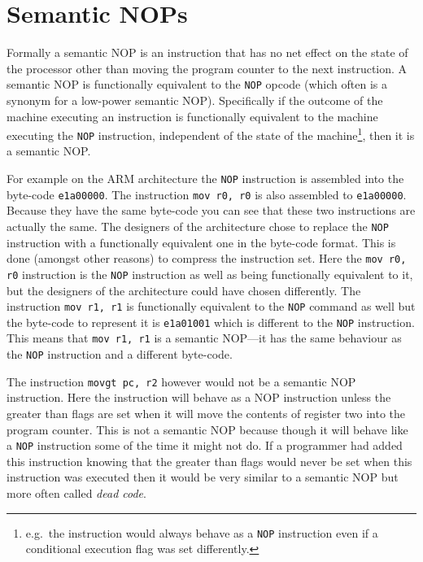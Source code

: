 \documentclass[10pt]{book}
\begin{document}
\section{Semantic NOPs}

Formally a semantic NOP is an instruction that has no net effect on the
state of the processor other than moving the program counter to the next
instruction. A semantic NOP is functionally equivalent to the
\lstinline!NOP! opcode (which often is a synonym for a low-power
semantic NOP). Specifically if the outcome of the machine executing an
instruction is functionally equivalent to the machine executing the
\lstinline!NOP! instruction, independent of the state of the
machine\footnote{e.g.~the instruction would always behave as a
  \lstinline!NOP! instruction even if a conditional execution flag was
  set differently.}, then it is a semantic NOP.

For example on the ARM architecture\autocite{Seal:2000vd} the
\lstinline!NOP! instruction is assembled into the byte-code
\lstinline!e1a00000!. The instruction \lstinline!mov r0, r0! is also
assembled to \lstinline!e1a00000!. Because they have the same byte-code
you can see that these two instructions are actually the same. The
designers of the architecture chose to replace the \lstinline!NOP!
instruction with a functionally equivalent one in the byte-code format.
This is done (amongst other reasons) to compress the instruction set.
Here the \lstinline!mov r0, r0! instruction is the \lstinline!NOP!
instruction as well as being functionally equivalent to it, but the
designers of the architecture could have chosen differently. The
instruction \lstinline!mov r1, r1! is functionally equivalent to the
\lstinline!NOP! command as well but the byte-code to represent it is
\lstinline!e1a01001! which is different to the \lstinline!NOP!
instruction. This means that \lstinline!mov r1, r1! is a semantic
NOP---it has the same behaviour as the \lstinline!NOP! instruction and a
different byte-code.

The instruction \lstinline!movgt pc, r2! however would not be a semantic
NOP instruction. Here the instruction will behave as a NOP instruction
unless the greater than flags are set when it will move the contents of
register two into the program counter. This is not a semantic NOP
because though it will behave like a \lstinline!NOP! instruction some of
the time it might not do. If a programmer had added this instruction
knowing that the greater than flags would never be set when this
instruction was executed then it would be very similar to a semantic NOP
but more often called \emph{dead code}\autocite{Collberg:1997vt}.
\end{document}
